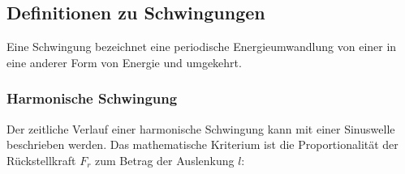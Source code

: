 




%
%	






\subsection{Definitionen zu Schwingungen} \label{subsec:definitionenzuschwingungen}

Eine Schwingung bezeichnet eine periodische Energieumwandlung von einer in eine anderer Form von Energie und umgekehrt. 


\subsubsection{Harmonische Schwingung}

Der zeitliche Verlauf einer harmonische Schwingung kann mit einer Sinuswelle beschrieben werden. Das mathematische Kriterium ist die Proportionalität der Rückstellkraft $F_{r}$ zum Betrag der Auslenkung $l$:

